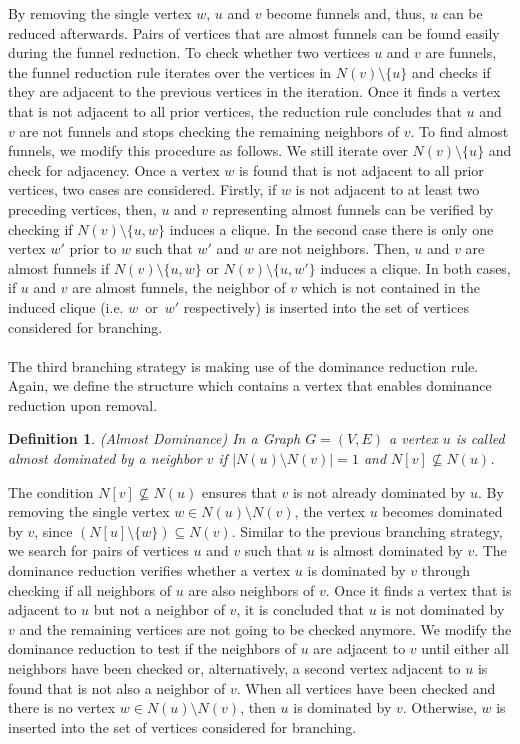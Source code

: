 \documentclass[]{article}
\newtheorem{definition}{Definition}
\begin{document}
By removing the single vertex $w$, $u$ and $v$ become funnels and, thus, $u$ can be reduced afterwards. Pairs of vertices that are almost funnels can be found easily during the funnel reduction. To check whether two vertices $u$ and $v$ are funnels, the funnel reduction rule iterates over the vertices in $N(v)\setminus \{u\}$ and checks if they are adjacent to the previous vertices in the iteration. Once it finds a vertex that is not adjacent to all prior vertices, the reduction rule concludes that $u$ and $v$ are not funnels and stops checking the remaining neighbors of $v$. To find almost funnels, we modify this procedure as follows. We still iterate over $N(v)\setminus\{u\}$ and check for adjacency. Once a vertex $w$ is found that is not adjacent to all prior vertices, two cases are considered. Firstly, if $w$ is not adjacent to at least two preceding vertices, then, $u$ and $v$ representing almost funnels can be verified by checking if $N(v)\setminus\{u,w\}$ induces a clique. In the second case there is only one vertex $w'$ prior to $w$ such that $w'$ and $w$ are not neighbors. Then, $u$ and $v$ are almost funnels if $N(v)\setminus\{u,w\}$ or $N(v)\setminus\{u,w'\}$ induces a clique. In both cases, if $u$ and $v$ are almost funnels, the neighbor of $v$ which is not contained in the induced clique (i.e. $w$~or~$w'$ respectively) is inserted into the set of vertices considered for branching.

\paragraph{}
The third branching strategy is making use of the dominance reduction rule. Again, we define the structure which contains a vertex that enables dominance reduction upon removal.

\begin{definition} (Almost Dominance)
	In a Graph $G=(V,E)$ a vertex $u$ is called almost dominated by a neighbor $v$ if $|N(u)\setminus N(v)| = 1$ and $N[v]\not\subseteq N(u)$.
\end{definition}

The condition $N[v]\not\subseteq N(u)$ ensures that $v$ is not already dominated by $u$. By removing the single vertex $w\in N(u)\setminus N(v)$, the vertex $u$ becomes dominated by $v$, since $(N[u]\setminus\{w\})\subseteq N(v)$. Similar to the previous branching strategy, we search for pairs of vertices $u$ and $v$ such that $u$ is almost dominated by $v$. The dominance reduction verifies whether a vertex $u$ is dominated by $v$ through checking if all neighbors of $u$ are also neighbors of $v$. Once it finds a vertex that is adjacent to $u$ but not a neighbor of $v$, it is concluded that $u$ is not dominated by $v$ and the remaining vertices are not going to be checked anymore. We modify the dominance reduction to test if the neighbors of $u$ are adjacent to $v$ until either all neighbors have been checked or, alternatively, a second vertex adjacent to $u$ is found that is not also a neighbor of $v$. When all vertices have been checked and there is no vertex $w \in N(u)\setminus N(v)$, then $u$ is dominated by $v$. Otherwise, $w$ is inserted into the set of vertices considered for branching.
\end{document}
